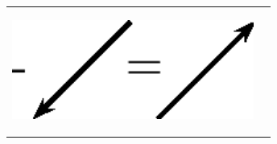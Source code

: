     
    \setlength\mytablespace{4\tabcolsep}
    \addtolength\mytablespace{3\arrayrulewidth}
    \setlength\mytablewidth{\linewidth}
        
    
    \setlength\mytableroom{\mytablewidth}
    \addtolength\mytableroom{-\mytablespace}
    
    \setlength\myfixedwidth{0pt}
    \setlength\mystarwidth{\mytableroom}
        \addtolength\mystarwidth{-\myfixedwidth}
        \divide{}
        
    
            
    
        \begin{center}
      
      \label{m38813*id188933}
      
    \noindent
      \tablelasttail{}
      \begin{xtabular*}{\mytablewidth}[t]{|p{10\mystarwidth}|p{10\mystarwidth}|}\hline
    
    
        
                  
    \setcounter{subfigure}{0}

\label{m38813*id188940}
    \begin{center}
    \label{m38813*id188940!!!underscore!!!media}\label{m38813*id188940!!!underscore!!!printimage}\includegraphics[width=300px]{col11305.imgs/m38813_PG11C1_035.png} %
        
      \vspace{2pt}
    \vspace{.1in}
    
    \end{center}




\end{xtabular*}
\end{center}
